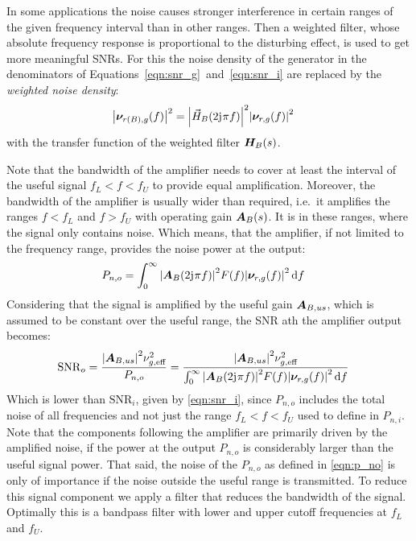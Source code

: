 In some applications the noise causes stronger interference in certain ranges of the given frequency interval than in other ranges. Then a weighted filter, whose absolute frequency response is proportional to the disturbing effect, is used to get more meaningful \ac{SNR}s. For this the noise density of the generator in the denominators of Equations~\ref{eqn:snr_g}~and~\ref{eqn:snr_i} are replaced by the \emph{weighted noise density}:
\begin{align}
  \abs{\bm{\nu}_{r(B),g}(f)}^2 &= \abs{\vec{H}_B(2\mathrm{j}\mkern1mu\pi f)}^2\abs{\bm{\nu}_{r,g}(f)}^2
\end{align}
with the transfer function of the weighted filter $\bm{H}_B(s)$.

Note that the bandwidth of the amplifier needs to cover at least the interval of the useful signal $f_L<f<f_U$ to provide equal amplification. Moreover, the bandwidth of the amplifier is usually wider than required, i.e.\ it amplifies the ranges $f<f_L$ and $f>f_U$ with operating gain $\bm{A}_B(s)$. It is in these ranges, where the signal only contains noise. Which means, that the amplifier, if not limited to the frequency range, provides the noise power at the output:
\begin{align}
  P_{n,o} &= \int_0^\infty \abs{\bm{A}_B(2\mathrm{j}\mkern1mu\pi f)}^2F(f)\abs{\bm{\nu}_{r,g}(f)}^2\dd{f} \label{eqn:p_no}
\end{align}
Considering that the signal is amplified by the useful gain $\bm{A}_{B,us}$, which is assumed to be constant over the useful range, the \ac{SNR} ath the amplifier output becomes:
\begin{align}
  \mathrm{SNR}_o &= \frac{\abs{\bm{A}_{B,us}}^2\nu_{g,\text{eff}}^2}{P_{n,o}} = \frac{\abs{\bm{A}_{B,us}}^2\nu_{g,\text{eff}}^2}{\int_0^\infty \abs{\bm{A}_B(2\mathrm{j}\mkern1mu\pi f)}^2F(f)\abs{\bm{\nu}_{r,g}(f)}^2\dd{f}}
\end{align}
Which is lower than $\mathrm{SNR}_i$, given by \eqref{eqn:snr_i}, since $P_{n,o}$ includes the total noise of all frequencies and not just the range $f_L<f<f_U$ used to define in $P_{n,i}$. Note that the components following the amplifier are primarily driven by the amplified noise, if the power at the output $P_{n,o}$ is considerably larger than the useful signal power. That said, the noise of the $P_{n,o}$ as defined in \eqref{eqn:p_no} is only of importance if the noise outside the useful range is transmitted. To reduce this signal component we apply a filter that reduces the bandwidth of the signal. Optimally this is a bandpass filter with lower and upper cutoff frequencies at $f_L$ and $f_U$.

